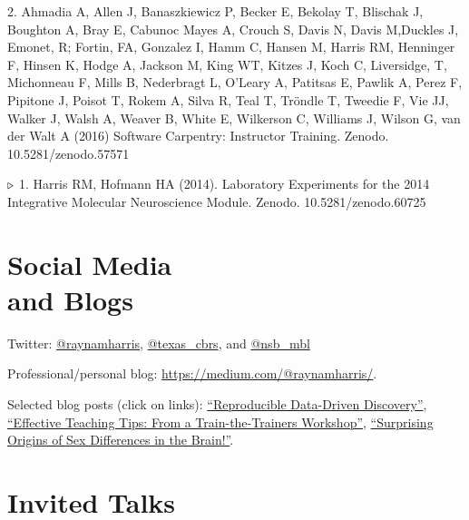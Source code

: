 \documentclass[margin,line]{resume}
\begin{document}
\begin{resume}
2. Ahmadia A, Allen J, Banaszkiewicz P, Becker E, Bekolay T, Blischak J, Boughton A, Bray E, Cabunoc Mayes A, Crouch S, Davis N, Davis M,Duckles J, Emonet, R; Fortin, FA, Gonzalez I, Hamm C, Hansen M, Harris RM, Henninger F, Hinsen K, Hodge A, Jackson M, King WT, Kitzes J, Koch C, Liversidge, T, Michonneau F, Mills B, Nederbragt L, O'Leary A, Patitsas E, Pawlik A, Perez F, Pipitone J, Poisot T, Rokem A, Silva R, Teal T, Tröndle T, Tweedie F, Vie JJ, Walker J, Walsh A, Weaver B, White E, Wilkerson C, Williams J, Wilson G, van der Walt A (2016) Software Carpentry: Instructor Training. Zenodo. 10.5281/zenodo.57571 

{\color{red} ${\bf \triangleright}$}
1. 	Harris RM, Hofmann HA (2014). Laboratory Experiments for the 2014 Integrative Molecular Neuroscience Module. Zenodo. 10.5281/zenodo.60725 


\section{\mysidestyle Social Media\\and Blogs}

Twitter: \href{http://twitter.com/raynamharris}{@raynamharris}, \href{http://twitter.com/texas\_cbrs}{@texas\_cbrs}, and \href{http://twitter.com/nsb\_mbl}{@nsb\_mbl} 

Professional/personal blog: \url{https://medium.com/@raynamharris/}.  

Selected blog posts (click on links): \href{https://medium.com/@raynamharris/reproducible-data-driven-discovery-decbf1de2f46#.c63q0cget}{``Reproducible Data-Driven Discovery''}, \href{http://blogs.plos.org/neuro/2015/02/12/effective-teaching-tips-from-a-train-the-trainers-workshop/}{``Effective Teaching Tips: From a Train-the-Trainers Workshop''}, \href{http://blogs.plos.org/neuro/2014/12/18/plos-sfn14-highlights-surprising-origins-of-sex-differences-in-the-brain/}{``Surprising Origins of Sex Differences in the Brain!''}.


\section{\mysidestyle Invited Talks}

\begin{list1}


\end{list1}
\end{resume}
\end{document}
